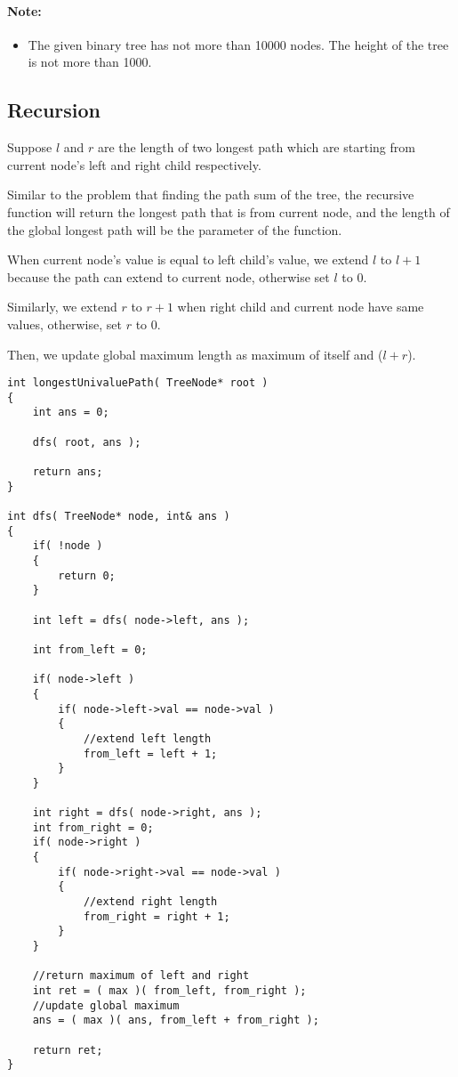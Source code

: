 \paragraph{Note: }
\begin{itemize}
\item The given binary tree has not more than 10000 nodes. The height of the tree is not more than 1000.
\end{itemize}

\subsection{Recursion}
Suppose $l$ and $r$ are the length of two longest path which are starting from current node's left and right child respectively.

Similar to the problem that finding the path sum of the tree, the recursive function will return the longest path that is from current node, and the length of the global longest path will be the parameter of the function.

When current node's value is equal to left child's value, we extend $l$ to $l+1$ because the path can extend to current node, otherwise set $l$ to 0.

Similarly, we extend $r$ to $r+1$ when right child and current node have same values, otherwise, set $r$ to 0.

Then, we update global maximum length as maximum of itself and ($l+r$).

\setcounter{lstlisting}{0}
\begin{lstlisting}[style=customc, caption={Recursion}]
int longestUnivaluePath( TreeNode* root )
{
    int ans = 0;

    dfs( root, ans );

    return ans;
}

int dfs( TreeNode* node, int& ans )
{
    if( !node )
    {
        return 0;
    }

    int left = dfs( node->left, ans );

    int from_left = 0;

    if( node->left )
    {
        if( node->left->val == node->val )
        {
            //extend left length
            from_left = left + 1;
        }
    }

    int right = dfs( node->right, ans );
    int from_right = 0;
    if( node->right )
    {
        if( node->right->val == node->val )
        {
            //extend right length
            from_right = right + 1;
        }
    }

    //return maximum of left and right
    int ret = ( max )( from_left, from_right );
    //update global maximum
    ans = ( max )( ans, from_left + from_right );

    return ret;
}
\end{lstlisting}